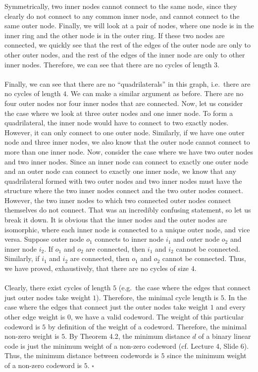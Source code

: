 \documentclass[letterpaper]{article}
\newcommand*{\QED}{\hfill\ensuremath{\square}}%
\begin{document}
Symmetrically, two inner nodes cannot connect to the same node, since they clearly do not connect to any common inner node, and cannot connect to the same outer node.
Finally, we will look at a pair of nodes, where one node is in the inner ring and the other node is in the outer ring.
If these two nodes are connected, we quickly see that the rest of the edges of the outer node are only to other outer nodes, and the rest of the edges of the inner node are only to other inner nodes.
Therefore, we can see that there are no cycles of length $ 3 $.
\\ \\
Finally, we can see that there are no ``quadrilaterals'' in this graph, i.e.\ there are no cycles of length $ 4 $.
We can make a similar argument as before.
There are no four outer nodes nor four inner nodes that are connected.
Now, let us consider the case where we look at three outer nodes and one inner node.
To form a quadrilateral, the inner node would have to connect to two exactly nodes.
However, it can only connect to one outer node.
Similarly, if we have one outer node and three inner nodes, we also know that the outer node cannot connect to more than one inner node.
Now, consider the case where we have two outer nodes and two inner nodes.
Since an inner node can connect to exactly one outer node and an outer node can connect to exactly one inner node, we know that any quadrilateral formed with two outer nodes and two inner nodes must have the structure where the two inner nodes connect and the two outer nodes connect.
However, the two inner nodes to which two connected outer nodes connect themselves do not connect.
That was an incredibly confusing statement, so let us break it down.
It is obvious that the inner nodes and the outer nodes are isomorphic, where each inner node is connected to a unique outer node, and vice versa.
Suppose outer node $ o_1 $ connects to inner node $ i_1 $ and outer node $ o_2 $ and inner node $ i_2 $.
If $ o_1 $ and $ o_2 $ are connected, then $ i_1 $ and $ i_2 $ cannot be connected.
Similarly, if $ i_1 $ and $ i_2 $ are connected, then $ o_1 $ and $ o_2 $ cannot be connected.
Thus, we have proved, exhaustively, that there are no cycles of size $ 4 $.
\\ \\
Clearly, there exist cycles of length $ 5 $ (e.g.\ the case where the edges that connect just outer nodes take weight $ 1 $).
Therefore, the minimal cycle length is $ 5 $.
In the case where the edges that connect just the outer nodes take weight $ 1 $ and every other edge weight is $ 0 $, we have a valid codeword.
The weight of this particular codeword is $ 5 $ by definition of the weight of a codeword.
Therefore, the minimal non-zero weight is $ 5 $.
By Theorem 4.2, the minimum distance $ d $ of a binary linear code is just the minimum weight of a non-zero codeword (cf. Lecture 4, Slide 6).
Thus, the minimum distance between codewords is $ 5 $ since the minimum weight of a non-zero codeword is $ 5 $.
\QED{}
\end{document}

